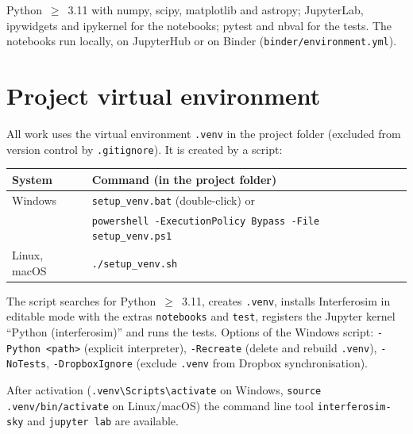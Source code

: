 
Python~$\geq$~3.11 with numpy, scipy, matplotlib and astropy; JupyterLab,
ipywidgets and ipykernel for the notebooks; pytest and nbval for the
tests. The notebooks run locally, on JupyterHub or on Binder
(\texttt{binder/environment.yml}).

\section{Project virtual environment}

All work uses the virtual environment \texttt{.venv} in the project
folder (excluded from version control by \texttt{.gitignore}). It is
created by a script:

\begin{center}
\begin{tabular}{@{}ll@{}}
\toprule
System & Command (in the project folder) \\
\midrule
Windows & \texttt{setup\_venv.bat} (double-click) or\\
        & \texttt{powershell -ExecutionPolicy Bypass -File setup\_venv.ps1} \\
Linux, macOS & \texttt{./setup\_venv.sh} \\
\bottomrule
\end{tabular}
\end{center}

The script searches for Python~$\geq$~3.11, creates \texttt{.venv}, installs
Interferosim in editable mode with the extras \texttt{notebooks} and
\texttt{test}, registers the Jupyter kernel \enquote{Python
(interferosim)} and runs the tests. Options of the Windows script:
\texttt{-Python <path>} (explicit interpreter), \texttt{-Recreate}
(delete and rebuild \texttt{.venv}), \texttt{-NoTests},
\texttt{-DropboxIgnore} (exclude \texttt{.venv} from Dropbox
synchronisation).

After activation (\texttt{.venv\textbackslash Scripts\textbackslash activate}
on Windows, \texttt{source .venv/bin/activate} on Linux/macOS) the command
line tool \texttt{interferosim-sky} and \texttt{jupyter lab} are available.
